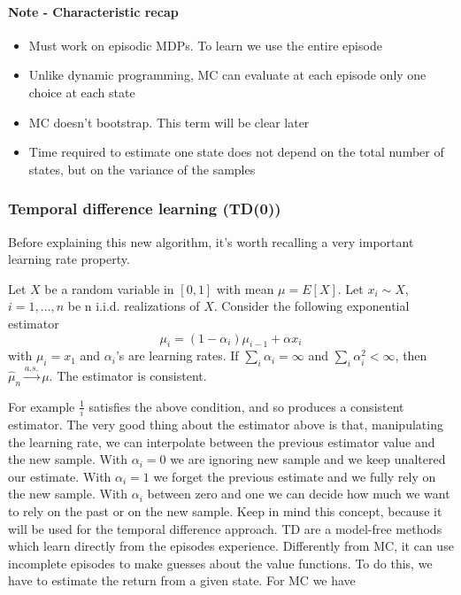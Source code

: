 \documentclass[main.tex]{subfiles}
\begin{document}
\paragraph{Note - Characteristic recap}
\begin{itemize}
    \item Must work on episodic MDPs. To learn we use the entire episode
    \item Unlike dynamic programming, MC can evaluate at each episode only one choice at each state
    \item MC doesn't bootstrap. This term will be clear later
    \item Time required to estimate one state does not depend on the total number of states, but on the variance of the samples
\end{itemize}
\newpage
\subsubsection{Temporal difference learning (TD(0))}
Before explaining this new algorithm, it's worth recalling a very important learning rate property.
\begin{proposition}
Let $X$ be a random variable in $[0, 1]$ with mean $\mu = E[X]$. Let $x_i \sim X$, $i=1,\dots,n$ be n i.i.d. realizations of $X$.
Consider the following exponential estimator
\begin{equation*}
    \mu_i = (1-\alpha_i) \mu_{i-1} + \alpha x_i
\end{equation*}
with $\mu_i=x_1$ and $\alpha_i$'s are learning rates.
\newline
If $\sum_i \alpha_i = \infty$ and $\sum_i \alpha_i^2 < \infty$, then $\hat{\mu}_n \overset{a.s.}{\rightarrow} \mu$. The estimator is consistent.
\end{proposition}
For example $\frac{1}{i}$ satisfies the above condition, and so produces a consistent estimator.
The very good thing about the estimator above is that, manipulating the learning rate, we can interpolate between the previous estimator value and the new sample. With $\alpha_i=0$ we are ignoring new sample and we keep unaltered our estimate. With $\alpha_i = 1$ we forget the previous estimate and we fully rely on the new sample. With $\alpha_i$ between zero and one we can decide how much we want to rely on the past or on the new sample. Keep in mind this concept, because it will be used for the temporal difference approach.
TD are a model-free methods which learn directly from the episodes experience. Differently from MC, it can use incomplete episodes to make guesses about the value functions. To do this, we have to estimate the return from a given state. For MC we have
\end{document}
